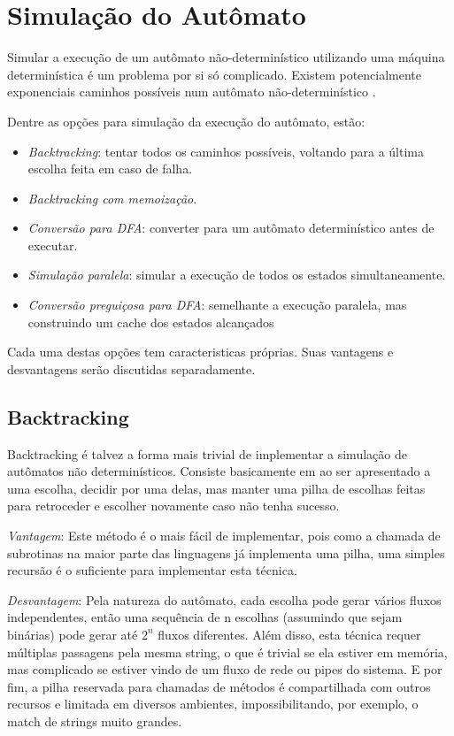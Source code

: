 \documentclass[a4paper,12pt,oneside,onecolumn]{uerj}
\begin{document}
\section{Simulação do Autômato}

Simular a execução de um autômato não-determinístico utilizando uma máquina determinística é um problema por si só complicado. Existem potencialmente exponenciais caminhos possíveis num autômato não-determinístico \cite{bib:Rabin59}.

Dentre as opções para simulação da execução do autômato, estão:

\begin{itemize}
    \item \emph{Backtracking}: tentar todos os caminhos possíveis, voltando para a última escolha feita em caso de falha.
    \item \emph{Backtracking com memoização}.
    \item \emph{Conversão para DFA}: converter para um autômato determinístico antes de executar.
    \item \emph{Simulação paralela}: simular a execução de todos os estados simultaneamente.
	\item \emph{Conversão preguiçosa para DFA}: semelhante a execução paralela, mas construindo um cache dos estados alcançados
\end{itemize}

Cada uma destas opções tem caracteristicas próprias. Suas vantagens e desvantagens serão discutidas separadamente.

\subsection{Backtracking}

Backtracking é talvez a forma mais trivial de implementar a simulação de autômatos não determinísticos. Consiste basicamente em ao ser apresentado a uma escolha, decidir por uma delas, mas manter uma pilha de escolhas feitas para retroceder e escolher novamente caso não tenha sucesso.

\emph{Vantagem}: Este método é o mais fácil de implementar, pois como a chamada de subrotinas na maior parte das linguagens já implementa uma pilha, uma simples recursão é o suficiente para implementar esta técnica.

\emph{Desvantagem}: Pela natureza do autômato, cada escolha pode gerar vários fluxos independentes, então uma sequência de n escolhas (assumindo que sejam binárias) pode gerar até $2^n$ fluxos diferentes. Além disso, esta técnica requer múltiplas passagens pela mesma string, o que é trivial se ela estiver em memória, mas complicado se estiver vindo de um fluxo de rede ou pipes do sistema. E por fim, a pilha reservada para chamadas de métodos é compartilhada com outros recursos e limitada em diversos ambientes, impossibilitando, por exemplo, o match de strings muito grandes.
\end{document}
